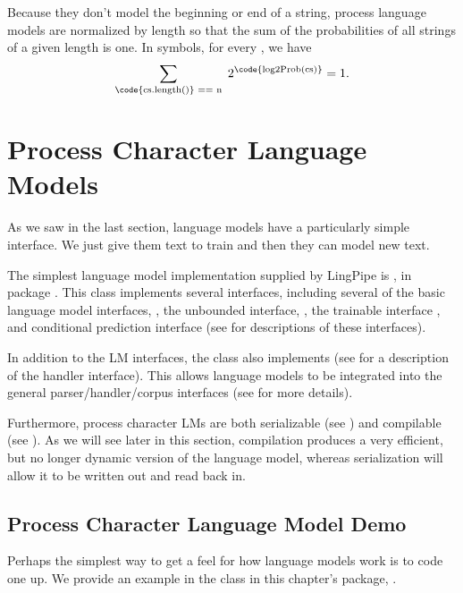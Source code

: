 Because they don't model the beginning or end of a string, process
language models are normalized by length so that the sum of the
probabilities of all strings of a given length is one.  In symbols,
for every , we have
%
\begin{equation}
\sum_{\text{\code{cs.length()} == n}} \hspace*{3pt} 2^{\text{\code{log2Prob(cs)}}} = 1.
\end{equation}
%


\section{Process Character Language Models}

As we saw in the last section, language models have a particularly
simple interface.  We just give them text to train and then they
can model new text. 

The simplest language model implementation supplied by LingPipe is
, in package .  This class
implements several interfaces, including several of the basic language
model interfaces, , the unbounded interface,
, the trainable interface
, and conditional prediction interface
 (see  for
descriptions of these interfaces).

In addition to the LM interfaces, the  class also
implements  (see
 for a description of the handler interface).
This allows language models to be integrated into the general
parser/handler/corpus interfaces (see  for more
details).

Furthermore, process character LMs are both serializable (see
) and compilable (see
).  As we will see later in this section,
compilation produces a very efficient, but no longer dynamic
version of the language model, whereas serialization will allow
it to be written out and read back in.


\subsection{Process Character Language Model Demo}\label{section:char-lm-process-demo}

Perhaps the simplest way to get a feel for how language models work is
to code one up.  We provide an example in the class
 in this chapter's package,
.  

